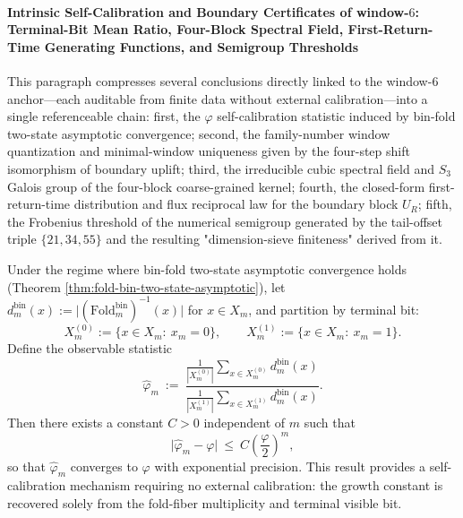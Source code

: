 \paragraph{Intrinsic Self-Calibration and Boundary Certificates of window-\texorpdfstring{$6$}{6}: Terminal-Bit Mean Ratio, Four-Block Spectral Field, First-Return-Time Generating Functions, and Semigroup Thresholds}
This paragraph compresses several conclusions directly linked to the window-\(6\) anchor—each auditable from finite data without external calibration—into a single referenceable chain: first, the \(\varphi\) self-calibration statistic induced by bin-fold two-state asymptotic convergence; second, the family-number window quantization and minimal-window uniqueness given by the four-step shift isomorphism of boundary uplift; third, the irreducible cubic spectral field and \(S_3\) Galois group of the four-block coarse-grained kernel; fourth, the closed-form first-return-time distribution and flux reciprocal law for the boundary block \(U_R\); fifth, the Frobenius threshold of the numerical semigroup generated by the tail-offset triple \(\{21,34,55\}\) and the resulting "dimension-sieve finiteness" derived from it.
\par

\begin{theorem}\label{thm:xi-foldbin-intrinsic-self-calibration-phi-lastbit-means}
Under the regime where bin-fold two-state asymptotic convergence holds (Theorem \ref{thm:fold-bin-two-state-asymptotic}),
let \(d_m^{\mathrm{bin}}(x):=\bigl|(\mathrm{Fold}^{\mathrm{bin}}_m)^{-1}(x)\bigr|\) for \(x\in X_m\), and partition by terminal bit:
\[
X_m^{(0)}:=\{x\in X_m:\ x_m=0\},
\qquad
X_m^{(1)}:=\{x\in X_m:\ x_m=1\}.
\]
Define the observable statistic
\[
\widehat\varphi_m
\ :=\
\frac{\frac{1}{|X_m^{(0)}|}\sum_{x\in X_m^{(0)}} d_m^{\mathrm{bin}}(x)}{\frac{1}{|X_m^{(1)}|}\sum_{x\in X_m^{(1)}} d_m^{\mathrm{bin}}(x)}.
\]
Then there exists a constant \(C>0\) independent of \(m\) such that
\[
\bigl|\widehat\varphi_m-\varphi\bigr|\ \le\ C\left(\frac{\varphi}{2}\right)^m,
\]
so that \(\widehat\varphi_m\) converges to \(\varphi\) with exponential precision.
This result provides a self-calibration mechanism requiring no external calibration: the growth constant is recovered solely from the fold-fiber multiplicity and terminal visible bit.
\end{theorem}

